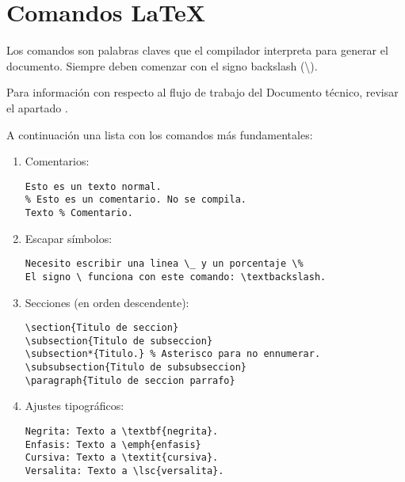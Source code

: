 
\section{Comandos \LaTeX}\label{anexo-latex}

Los comandos son palabras claves que el compilador interpreta para generar el documento. Siempre deben comenzar con el signo backslash (\textbackslash).

\noindent Para información con respecto al flujo de trabajo del Documento técnico, revisar el apartado .

\noindent A continuación una lista con los comandos más fundamentales:

\begin{enumerate}
\item Comentarios:
\lstset{style=latex}
\begin{lstlisting}
Esto es un texto normal.
% Esto es un comentario. No se compila.
Texto % Comentario.
\end{lstlisting}
\item Escapar símbolos:
\begin{lstlisting}
Necesito escribir una linea \_ y un porcentaje \%
El signo \ funciona con este comando: \textbackslash.
\end{lstlisting}
\item Secciones (en orden descendente):
\begin{lstlisting}
\section{Titulo de seccion}
\subsection{Titulo de subseccion}
\subsection*{Titulo.} % Asterisco para no ennumerar.
\subsubsection{Titulo de subsubseccion}
\paragraph{Titulo de seccion parrafo}
\end{lstlisting}
\item Ajustes tipográficos:
\begin{lstlisting}
Negrita: Texto a \textbf{negrita}.
Enfasis: Texto a \emph{enfasis}
Cursiva: Texto a \textit{cursiva}.
Versalita: Texto a \lsc{versalita}.
\end{lstlisting}


\end{enumerate}
